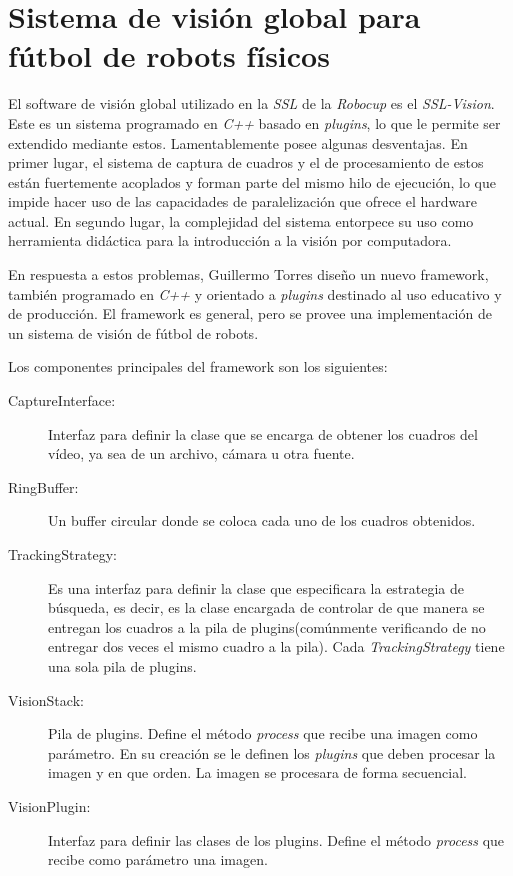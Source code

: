 
\section{Sistema de visión global para fútbol de robots físicos}

El software de visión global utilizado en la \emph{SSL} de la \emph{Robocup} es
el \emph{SSL-Vision}. Este es un sistema programado en \emph{C++} basado en
\emph{plugins}, lo que le permite ser extendido mediante estos. Lamentablemente
posee algunas desventajas. En primer lugar, el sistema de captura de cuadros y
el de procesamiento de estos están fuertemente acoplados y forman parte del
mismo hilo de ejecución, lo que impide hacer uso de las capacidades de
paralelización que ofrece el hardware actual. En segundo lugar, la complejidad
del sistema entorpece su uso como herramienta didáctica para la introducción a
la visión por computadora.

En respuesta a estos problemas, Guillermo Torres\cite{torres2014} diseño un
nuevo framework, también programado en \emph{C++} y orientado a \emph{plugins}
destinado al uso educativo y de producción. El framework es general, pero se
provee una implementación de un sistema de visión de fútbol de robots.

Los componentes principales del framework son los siguientes:

\begin{description}

	\item[CaptureInterface:] Interfaz para definir la clase que se encarga
		de obtener los cuadros del vídeo, ya sea de un archivo, cámara u
		otra fuente.

	\item[RingBuffer:] Un buffer circular donde se coloca cada uno de los
		cuadros obtenidos.

	\item[TrackingStrategy:] Es una interfaz para definir la clase que
		especificara la estrategia de búsqueda, es decir, es la clase
		encargada de controlar de que manera se entregan los cuadros a
		la pila de plugins(comúnmente verificando de no entregar dos
		veces el mismo cuadro a la pila). Cada \emph{TrackingStrategy}
		tiene una sola pila de plugins.
	
	\item[VisionStack:] Pila de plugins. Define el método \emph{process} que
		recibe una imagen como parámetro. En su creación se le definen
		los \emph{plugins} que deben procesar la imagen y en que orden.
		La imagen se procesara de forma secuencial.

	\item[VisionPlugin:] Interfaz para definir las clases de los plugins.
		Define el método \emph{process} que recibe como parámetro una
		imagen.

\end{description}

